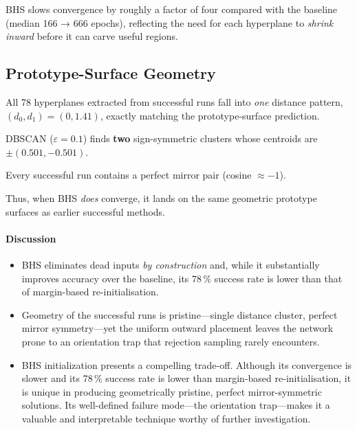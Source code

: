 BHS slows convergence by roughly a factor of four compared with the
baseline (median 166 → 666 epochs), reflecting the need for each
hyperplane to \emph{shrink inward} before it can carve useful regions.

\subsection*{Prototype-Surface Geometry}

\begin{description}[leftmargin=2em]
  \item[Distance clusters]
        All 78 hyperplanes extracted from successful runs fall into
        \emph{one} distance pattern,
        \((d_{0},d_{1})\!=\!(0,1.41)\),
        exactly matching the prototype-surface prediction.
  \item[Weight clusters]
        DBSCAN ($\varepsilon=0.1$) finds \textbf{two}
        sign-symmetric clusters whose centroids are
        $\pm(0.501,-0.501)$.%
  \item[Mirror symmetry]
        Every successful run contains a perfect mirror pair
        (cosine $\approx -1$).%
\end{description}

Thus, when BHS \emph{does} converge, it lands on the
same geometric prototype surfaces as earlier successful methods.

\paragraph{Discussion}
\begin{itemize}
  \item BHS eliminates dead inputs \emph{by construction} and, while 
      it substantially improves accuracy over the baseline, its $78\,\%$ 
      success rate is lower than that of margin-based re-initialisation.
  \item Geometry of the successful runs is pristine—single distance
      cluster, perfect mirror symmetry—yet the uniform outward
      placement leaves the network prone to an orientation trap that
      rejection sampling rarely encounters.
  \item BHS initialization presents a compelling trade-off. Although 
      its convergence is slower and its 78\,\% success rate is lower than 
      margin-based re-initialisation, it is unique in producing geometrically 
      pristine, perfect mirror-symmetric solutions. Its well-defined failure 
      mode—the orientation trap—makes it a valuable and interpretable technique 
      worthy of further investigation.
\end{itemize}

\hrulefill
